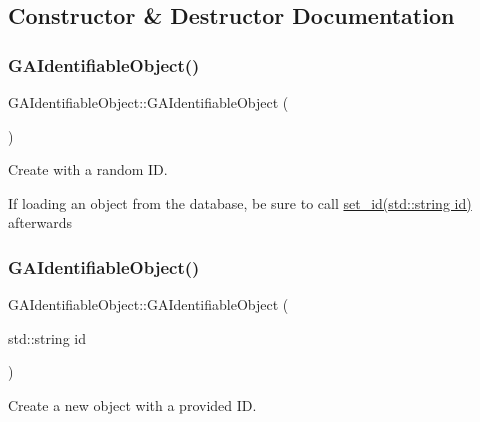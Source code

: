 \subsection{Constructor \& Destructor Documentation}
\mbox{\label{class_g_a_identifiable_object_a22300b23e98b09ca27b87f50cecdd1da}} 
\subsubsection{\texorpdfstring{G\+A\+Identifiable\+Object()}{GAIdentifiableObject()}\hspace{0.1cm}{\footnotesize\ttfamily [1/2]}}
{\footnotesize\ttfamily G\+A\+Identifiable\+Object\+::\+G\+A\+Identifiable\+Object (\begin{DoxyParamCaption}{ }\end{DoxyParamCaption})}



Create with a random ID. 

If loading an object from the database, be sure to call \hyperlink{class_g_a_identifiable_object_a6b0a4580ef8e6e3f9b0a39fbc9d424e0}{set\+\_\+id(std\+::string id)} afterwards \mbox{\label{class_g_a_identifiable_object_a80ca248b066ca01681ebbc89a7f32c03}} 
\subsubsection{\texorpdfstring{G\+A\+Identifiable\+Object()}{GAIdentifiableObject()}\hspace{0.1cm}{\footnotesize\ttfamily [2/2]}}
{\footnotesize\ttfamily G\+A\+Identifiable\+Object\+::\+G\+A\+Identifiable\+Object (\begin{DoxyParamCaption}\item[{std\+::string}]{id }\end{DoxyParamCaption})}



Create a new object with a provided ID. 


